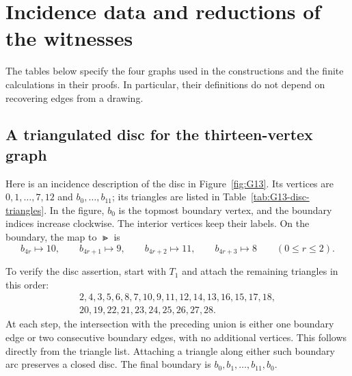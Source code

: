 \section{Incidence data and reductions of the witnesses}\label{app:certificates}

The tables below specify the four graphs used in the constructions
and the finite calculations in their proofs. In particular, their
definitions do not depend on recovering edges from a drawing.

\begin{table}[htbp]
\centering\small
\caption{For each vertex $i$, the entries are precisely its neighbours
larger than $i$. Thus each edge occurs once. The symbol $\varnothing$
means that there is no larger neighbour; the dash indicates that the
vertex is absent.}\label{tab:witness-adjacency}

\end{table}

\subsection{A triangulated disc for the thirteen-vertex graph}
\label{app:disc-certificates}

Here is an incidence description of the disc in Figure~\ref{fig:G13}.
Its vertices are $0,1,\ldots,7,12$ and $b_0,\ldots,b_{11}$; its
triangles are listed in Table~\ref{tab:G13-disc-triangles}.
In the figure, $b_0$ is the topmost boundary vertex, and the boundary
indices increase clockwise.
The interior vertices keep their labels. On the boundary, the map
to $\Gt$ is
\[
 b_{4r}\longmapsto10,\qquad
 b_{4r+1}\longmapsto9,\qquad
 b_{4r+2}\longmapsto11,\qquad
 b_{4r+3}\longmapsto8\qquad(0\le r\le2).
\]

\begin{table}[htbp]
\centering\small
\caption{The triangles of the disc whose boundary is attached with
degree three.}\label{tab:G13-disc-triangles}

\end{table}

To verify the disc assertion, start with $T_1$ and attach the remaining
triangles in this order:
\[
\begin{gathered}
2,4,3,5,6,8,7,10,9,11,12,14,13,16,15,17,18,\\
20,19,22,21,23,24,25,26,27,28.
\end{gathered}
\]
At each step, the intersection with the preceding union is either
one boundary edge or two consecutive boundary edges, with no
additional vertices. This follows directly from the triangle list.
Attaching a triangle along either such boundary arc preserves a
closed disc. The final boundary is
$b_0,b_1,\ldots,b_{11},b_0$.

